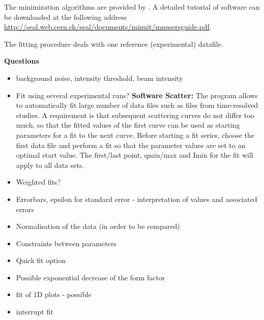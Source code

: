 The minimization algorithms are provided by . A detailed tutorial of  software can be downloaded at the
following address \url{http://seal.web.cern.ch/seal/documents/minuit/mnusersguide.pdf}.


The fitting procedure deals with one reference (experimental) datafile. 
 
\textbf{Questions}
\begin{itemize}
\item background noise, intensity threshold, beam intensity 
\item Fit using several experimental runs?
\textbf{ Software Scatter:} The program allows to automatically fit large number of data files such as files from time-resolved
studies. A requirement is that subsequent scattering curves do not differ too much, so
that the fitted values of the first curve can be used as starting parameters for a fit to the next
curve. Before starting a fit series, choose the first data file and perform a fit so that the
parameter values are set to an optimal start value. The first/last point, qmin/max and Imin for
the fit will apply to all data sets.
\item Weighted fits?
\item Errorbars, epsilon for standard error - interpretation of values
  and associated errors
\item Normalisation of the data (in order to be compared)
\item Constraints between parameters
\item Quick fit option
\item Possible exponential decrease of the form factor
\item fit of 1D plots - possible
\item interrupt fit
\end{itemize}

